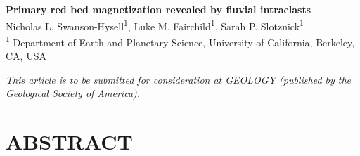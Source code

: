 \documentclass[11pt,letterpaper]{article}
\begin{document}
\begin{flushleft}
{\Large \textbf{Primary red bed magnetization revealed by fluvial intraclasts}}
\\
Nicholas L. Swanson-Hysell\textsuperscript{1},
Luke M. Fairchild\textsuperscript{1},
Sarah P. Slotznick\textsuperscript{1}
\\
\bigskip
\textsuperscript{1} Department of Earth and Planetary Science, University of California, Berkeley, CA, USA
\bigskip

\end{flushleft}

\noindent\textit{This article is to be submitted for consideration at GEOLOGY (published by the Geological Society of America).}

\linenumbers
\pagestyle{empty}

\section*{ABSTRACT}
\end{document}
